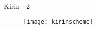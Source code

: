 \begin{frame}{Kirin - 2}

\begin{figure}
  \centering
  \texttt{[image: kirinscheme]}
\end{figure}

\end{frame}